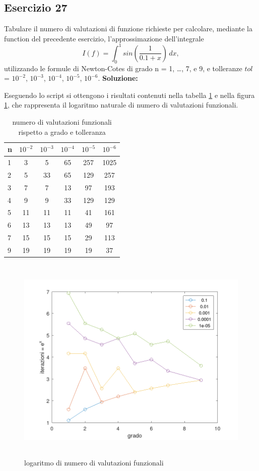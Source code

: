 \subsection{Esercizio 27}
Tabulare il numero di valutazioni di funzione richieste per calcolare, mediante la
function del precedente esercizio, l'approssimazione dell'integrale
\[
    I(f) = \int_{0}^{1} sin\left(\frac{1}{0.1+x}\right)\,dx,
\]
utilizzando le formule di Newton-Cotes di grado n = 1, \dots, 7, e 9,
e tolleranze $tol$ = $10^{-2}$, $10^{-3}$, $10^{-4}$, $10^{-5}$, $10^{-6}$.
\newline \textbf{Soluzione:}

Eseguendo lo script  si ottengono i risultati contenuti nella
tabella \ref{tab:27} e nella figura \ref{fig:es27}, che rappresenta il
logaritmo naturale di numero di valutazioni funzionali.
\begin{table}[h]
    \centering
    \renewcommand\arraystretch{2}
    \begin{tabular}{| l | c c c c c |}
        \hline
        n & $10^{-2}$ & $10^{-3}$ & $10^{-4}$ & $10^{-5}$ & $10^{-6}$ \\
        \hline
        1 & 3         & 5         & 65        & 257       & 1025      \\
        2 & 5         & 33        & 65        & 129       & 257       \\
        3 & 7         & 7         & 13        & 97        & 193       \\
        4 & 9         & 9         & 33        & 129       & 129       \\
        5 & 11        & 11        & 11        & 41        & 161       \\
        6 & 13        & 13        & 13        & 49        & 97        \\
        7 & 15        & 15        & 15        & 29        & 113       \\
        9 & 19        & 19        & 19        & 19        & 37        \\
        \hline
    \end{tabular}
    \caption{numero di valutazioni funzionali rispetto a grado e tolleranza}
    \label{tab:27}
\end{table}
\begin{figure}[!ht]
    \centering
    \includegraphics[width=16cm,height=10cm,keepaspectratio]{capitolo5/es27_figure.png}
    \caption{logaritmo di numero di valutazioni funzionali}
    \label{fig:es27}
\end{figure}
\FloatBarrier
